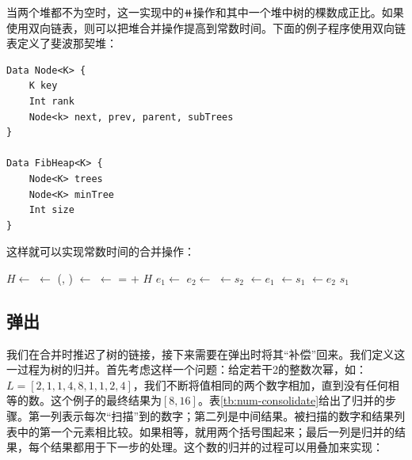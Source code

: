 \documentclass[b5paper]{ctexart}
\begin{document}
当两个堆都不为空时，这一实现中的$\doubleplus$操作和其中一个堆中树的棵数成正比。如果使用双向链表，则可以把堆合并操作提高到常数时间。下面的例子程序使用双向链表定义了斐波那契堆：

\begin{lstlisting}[language = Bourbaki]
Data Node<K> {
    K key
    Int rank
    Node<k> next, prev, parent, subTrees
}

Data FibHeap<K> {
    Node<K> trees
    Node<K> minTree
    Int size
}
\end{lstlisting}

这样就可以实现常数时间的合并操作：

\begin{algorithmic}[1]
  \State $H \gets$ 
  \State {} $\gets$ (, )
    \State {} $\gets$ 
  \Else
    \State {} $\gets$ 
  \EndIf
   =  + 
  \State \Return $H$
\EndFunction
\Statex
{}
  \State $e_1 \gets$ 
  \State $e_2 \gets$ 
  \State {} $\gets s_2$
  \State {} $\gets e_1$
  \State {} $\gets s_1$
  \State {} $\gets e_2$
  \State \Return $s_1$
\EndFunction
\end{algorithmic}

\subsection{弹出}
 

我们在合并时推迟了树的链接，接下来需要在弹出时将其“补偿”回来。我们定义这一过程为树的归并。首先考虑这样一个问题：给定若干2的整数次幂，如：$L = [2, 1, 1, 4, 8, 1, 1, 2, 4]$，我们不断将值相同的两个数字相加，直到没有任何相等的数。这个例子的最终结果为$[8, 16]$。表\ref{tb:num-consolidate}给出了归并的步骤。第一列表示每次“扫描”到的数字；第二列是中间结果。被扫描的数字和结果列表中的第一个元素相比较。如果相等，就用两个括号围起来；最后一列是归并的结果，每个结果都用于下一步的处理。这个数的归并的过程可以用叠加来实现：
\end{document}
